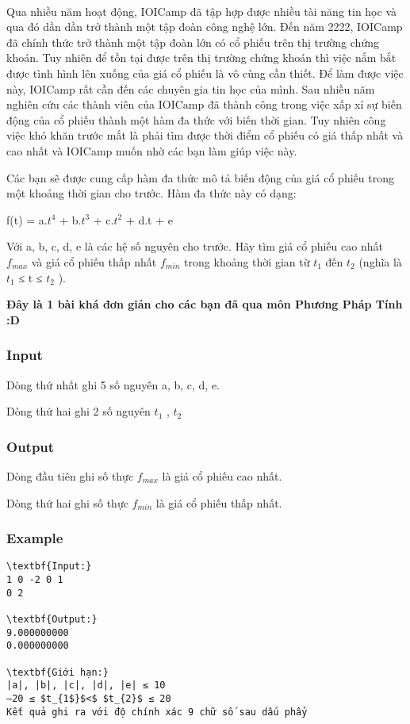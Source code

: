 

 

Qua nhiều năm hoạt động, IOICamp đã tập hợp được nhiều tài năng tin học và qua đó dần dần trở thành một tập đoàn công nghệ lớn. Đến năm 2222, IOICamp đã chính thức trở thành một tập đoàn lớn có cổ phiếu trên thị trường chứng khoán. Tuy nhiên để tồn tại được trên thị trường chứng khoán thì việc nắm bắt được tình hình lên xuống của giá cổ phiếu là vô cùng cần thiết. Để làm được việc này, IOICamp rất cần đến các chuyên gia tin học của mình. Sau nhiều năm nghiên cứu các thành viên của IOICamp đã thành công trong việc xấp xỉ sự biến động của cổ phiếu thành một hàm đa thức với biến thời gian. Tuy nhiên công việc khó khăn trước mắt là phải tìm được thời điểm cổ phiếu có giá thấp nhất và cao nhất và IOICamp muốn nhờ các bạn làm giúp việc này.

Các bạn sẽ được cung cấp hàm đa thức mô tả biến động của giá cổ phiếu trong một khoảng thời gian cho trước. Hàm đa thức này có dạng:

f(t) = a.$t^{4}$ + b.$t^{3}$ + c.$t^{2}$ + d.t + e

Với a, b, c, d, e là các hệ số nguyên cho trước. Hãy tìm giá cổ phiếu cao nhất $f_{max}$ và giá cổ phiếu thấp nhất $f_{min}$ trong khoảng thời gian từ $t_{1}$ đến $t_{2}$ (nghĩa là $t_{1}$ ≤ t ≤ $t_{2}$ ).

\textbf{Đ}\textbf{ây là 1 bài khá đơn giản cho các bạn đã qua môn Phương Pháp Tính :D }

\subsubsection{Input}

Dòng thứ nhất ghi 5 số nguyên a, b, c, d, e.

Dòng thứ hai ghi 2 số nguyên $t_{1}$ , $t_{2}$

\subsubsection{Output}

Dòng đầu tiên ghi số thực $f_{max}$ là giá cổ phiếu cao nhất.

Dòng thứ hai ghi số thực $f_{min}$ là giá cổ phiếu thấp nhất.

\subsubsection{Example}
\begin{verbatim}
\textbf{Input:}
1 0 -2 0 1
0 2

\textbf{Output:}
9.000000000
0.000000000

\textbf{Giới hạn:}
|a|, |b|, |c|, |d|, |e| ≤ 10
–20 ≤ $t_{1$}$<$ $t_{2}$ ≤ 20
Kết quả ghi ra với độ chính xác 9 chữ số sau dấu phẩy
\end{verbatim}
